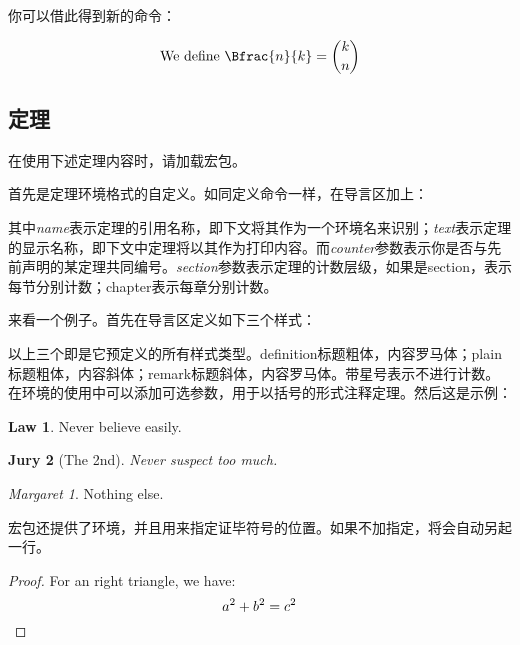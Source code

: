 你可以借此得到新的命令：
\begin{codeshow}
\[\text{We define }\Bfrac{n}{k}=\binom{k}{n}\]
\end{codeshow}

\subsection{定理}
在使用下述定理内容时，请加载宏包。

首先是定理环境格式的自定义。如同定义命令一样，在导言区加上：
\begin{latex}
\newtheorem{envname}[counter]{text}[section]
\end{latex}

其中\textit{name}表示定理的引用名称，即下文将其作为一个环境名来识别；\textit{text}表示定理的显示名称，即下文中定理将以其作为打印内容。而\textit{counter}参数表示你是否与先前声明的某定理共同编号。\textit{section}参数表示定理的计数层级，如果是section，表示每节分别计数；chapter表示每章分别计数。

来看一个例子。首先在导言区定义如下三个样式：
\begin{latex}
\theoremstyle{definition}\newtheorem{laws}{Law}[section]
\theoremstyle{plain}\newtheorem{ju}[laws]{Jury}
\theoremstyle{remark}\newtheorem*{marg}{Margaret}
\end{latex}

以上三个即是它预定义的所有样式类型。definition标题粗体，内容罗马体；plain标题粗体，内容斜体；remark标题斜体，内容罗马体。带星号表示不进行计数。在环境的使用中可以添加可选参数，用于以括号的形式注释定理。然后这是示例：

\begin{codeshow}
\begin{laws}
Never believe easily.
\end{laws}
\begin{ju}[The 2nd]
Never suspect too much.
\end{ju}
\begin{marg}Nothing else.\end{marg}
\end{codeshow}

宏包还提供了环境，并且用来指定证毕符号的位置。如果不加指定，将会自动另起一行。

\begin{codeshow}
\begin{proof}
For an right triangle, we have:
  \[a^2+b^2=c^2 \qedhere\]
\end{proof}
\end{codeshow}

